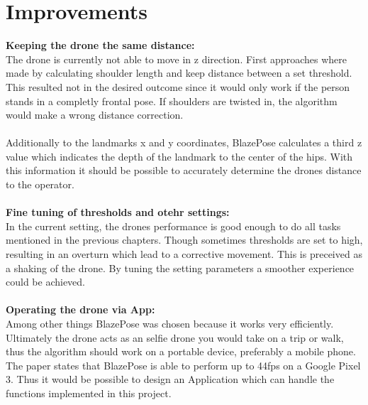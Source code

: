 \documentclass[a4paper,11pt,singlespacing]{article}
\begin{document}
\pagebreak
\section{Improvements}
\textbf{Keeping the drone the same distance:}\\
The drone is currently not able to move in z direction. First approaches where made by calculating
shoulder length and keep distance between a set threshold. 
This resulted not in the desired outcome since it would only work if the person stands in a completly frontal pose.
If shoulders are twisted in, the algorithm would make a wrong distance correction.
\\\\
Additionally to the landmarks x and y coordinates, BlazePose calculates a third z value 
which indicates the depth of the landmark to the center of the hips. 
With this information it should be possible to accurately determine the drones distance to the operator.
\\\\
\textbf{Fine tuning of thresholds and otehr settings:}\\
In the current setting, the drones performance is good enough to do 
all tasks mentioned in the previous chapters. Though sometimes thresholds are set to high, 
resulting in an overturn which lead to a corrective movement. This is preceived as a shaking of the drone.
By tuning the setting parameters a smoother experience could be achieved.
\\\\
\textbf{Operating the drone via App:}\\
Among other things BlazePose was chosen because it works very efficiently.
Ultimately the drone acts as an selfie drone you would take on a trip or walk, 
thus the algorithm should work on a portable device, preferably a mobile phone.\\
The paper states\cite{BlazePosePaper} that BlazePose is able to perform up to 44fps on a Google Pixel 3.
Thus it would be possible to design an Application which can handle the functions implemented in this project. 

\pagebreak
\listoffigures
\pagebreak
\printbibliography[heading=bibintoc]
\pagebreak
\lstlistoflistings
\pagebreak




\end{document}
